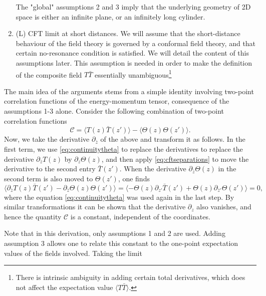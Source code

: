 \begin{enumerate}
    The "global" assumptions 2 and 3 imply that the underlying geometry of 2D
    space is either an infinite plane, or an infinitely long cylinder.
  \item (L) CFT limit at short distances. We will assume that the
    short-distance behaviour of the field theory is governed by a conformal
    field theory, and that certain no-resonance condition is satisfied. We will
    detail the content of this assumptions later. This assumption is needed in
    order to make the definition of the composite field $T\bar{T}$ essentially
    unambiguous\footnote{There is intrinsic ambiguity in adding certain total
      derivatives, which does not affect the expectation value $\langle
      T\bar{T}\rangle$.}
  \end{enumerate}

  The main idea of the arguments stems from a simple identity involving
  two-point correlation functions of the energy-momentum tensor, consequence of
  the assumptions 1-3 alone. Consider the following combination of two-point
  correlation functions
  \begin{equation}
    \mathcal{C} = \langle T(z)\bar{T}(z') \rangle - \langle \Theta(z)
    \Theta(z')\rangle.
    \label{eq:constantc}
  \end{equation}
  Now, we take the derivative $\partial_{\bar{z}}$ of the above and transform it
  as follows. In the first term, we use \eqref{eq:continuitytheta} to replace
  the derivatives to replace the derivative $\partial_{\bar{z}}T(z)$ by
  $\partial_z\Theta(z)$, and then apply \eqref{eq:cftseparations} to
  move the derivative to the second entry $\bar{T}(z')$. When the
  derivative $\partial_\bar{z}\Theta(z)$ in the second term is also
  moved to $\Theta(z')$, one finds
  \begin{equation}
  \langle \partial_{\bar{z}}T(z)\bar{T}(z')
  - \partial_{\bar{z}}\Theta(z)\Theta(z')\rangle = \langle
    -\Theta(z)\partial_{z'}\bar{T}(z')
    + \Theta(z)\partial_{\bar{z}'}\Theta(z')\rangle = 0,
  \end{equation}
  where the equation \eqref{eq:continuitytheta} was used again in the last
  step. By similar transformations it can be shown that the derivative
  $\partial_z$ also vanishes, and hence the quantity $\mathcal{C}$ is
  a constant, independent of the coordinates.
  \par Note that in this derivation, only assumptions 1 and 2 are used. Adding
  assumption 3 allows one to relate this constant to the one-point expectation
  values of the fields involved. Taking the limit
